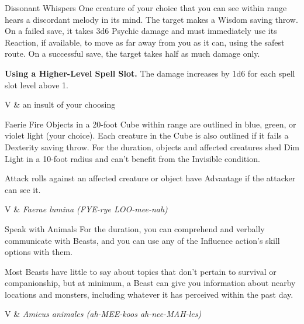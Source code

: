 \begin{Spell}[
    level=1st,
    time=1 Action,
    range=60 ft.,
    components={V},
    duration=Instantaneous,
    school=Enchantment,
    attack=WIS Save,
    effect=Psychic
]{Dissonant Whispers}
One creature of your choice that you can see within range hears a discordant melody in its mind. The target makes a Wisdom saving throw. On a failed save, it takes 3d6 Psychic damage and must immediately use its Reaction, if available, to move as far away from you as it can, using the safest route. On a successful save, the target takes half as much damage only.

\textbf{Using a Higher-Level Spell Slot.} The damage increases by 1d6 for each spell slot level above 1.

\begin{components}
V & an insult of your choosing
\end{components}
\end{Spell}


\begin{Spell}[
    tags=Concentration,
    level=1st,
    time=1 Action,
    range=60 ft. (20 ft. ),
    components={V},
    duration=1 Minute,
    school=Evocation,
    attack=DEX Save,
    effect=Debuff
]{Faerie Fire}
Objects in a 20-foot Cube within range are outlined in blue, green, or violet light (your choice). Each creature in the Cube is also outlined if it fails a Dexterity saving throw. For the duration, objects and affected creatures shed Dim Light in a 10-foot radius and can't benefit from the Invisible condition.

Attack rolls against an affected creature or object have Advantage if the attacker can see it.
\begin{components}
V & \textit{Faerae lumina (FYE-rye LOO-mee-nah)}
\end{components}
\end{Spell}


\begin{Spell}[
    tags=Ritual,
    level=1st,
    time=1 Action,
    range=Self,
    components={V,S},
    duration=10 Minutes,
    school=Divination,
    attack=None,
    effect=Communication
]{Speak with Animals}
For the duration, you can comprehend and verbally communicate with Beasts, and you can use any of the Influence action's skill options with them.

Most Beasts have little to say about topics that don't pertain to survival or companionship, but at minimum, a Beast can give you information about nearby locations and monsters, including whatever it has perceived within the past day.
\begin{components}
V & \textit{Amicus animales (ah-MEE-koos ah-nee-MAH-les)}
\end{components}
\end{Spell}


